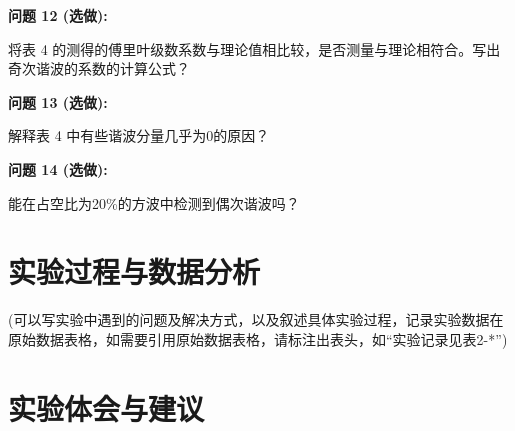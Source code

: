 \documentclass{sasreport}
\begin{document}
\textbf{问题 12 (选做):}

将表 4 的测得的傅里叶级数系数与理论值相比较，是否测量与理论相符合。写出奇次谐波的系数的计算公式？

\textbf{问题 13 (选做):}

解释表 4 中有些谐波分量几乎为0的原因？

\textbf{问题 14 (选做):}

能在占空比为20\%的方波中检测到偶次谐波吗？

\section{实验过程与数据分析}
 {\kaishu (可以写实验中遇到的问题及解决方式，以及叙述具体实验过程，记录实验数据在原始数据表格，如需要引用原始数据表格，请标注出表头，如“实验记录见表2-*”)}

\section{实验体会与建议}
\end{document}
